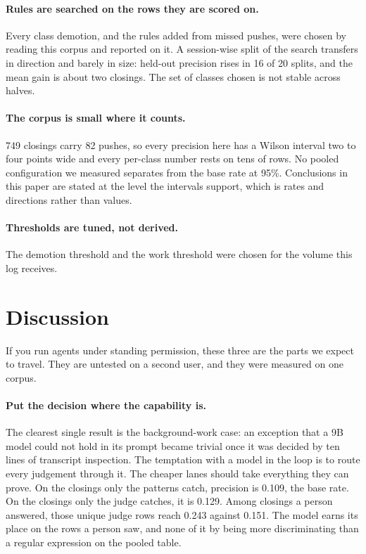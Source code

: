 \paragraph{Rules are searched on the rows they are scored on.} Every class
demotion, and the rules added from missed pushes, were chosen by reading this
corpus and reported on it. A session-wise split of the search transfers in
direction and barely in size: held-out precision rises in 16 of 20 splits, and
the mean gain is about two closings. The set of classes chosen is not stable
across halves.

\paragraph{The corpus is small where it counts.} 749 closings carry 82 pushes,
so every precision here has a Wilson interval two to four points wide and every
per-class number rests on tens of rows. No pooled configuration we measured
separates from the base rate at 95\%. Conclusions in this paper are stated at
the level the intervals support, which is rates and directions rather than
values.

\paragraph{Thresholds are tuned, not derived.} The demotion threshold and the
work threshold were chosen for the volume this log receives.

\section{Discussion}

If you run agents under standing permission, these three are the parts
we expect to travel. They are untested on a second user, and they were
measured on one corpus.

\paragraph{Put the decision where the capability is.} The clearest single result
is the background-work case: an exception that a 9B model could not hold in its
prompt became trivial once it was decided by ten lines of transcript inspection.
The temptation with a model in the loop is to route every judgement through
it. The cheaper lanes should take everything they can prove. On the closings
only the patterns catch, precision is 0.109, the base rate. On the closings
only the judge catches, it is 0.129. Among closings a person answered, those
unique judge rows reach 0.243 against 0.151. The model earns its place on the
rows a person saw, and none of it by being more discriminating than a regular
expression on the pooled table.

